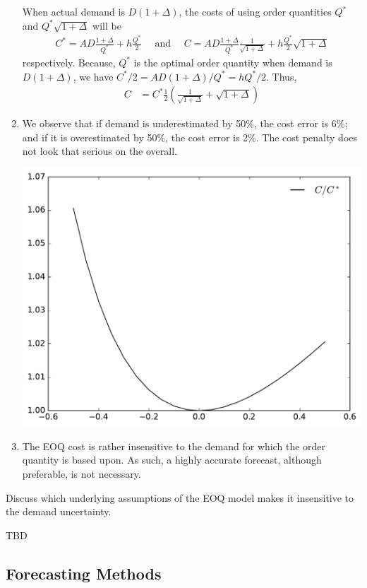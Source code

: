\begin{question}
\begin{solution}
\begin{enumerate}
When actual demand is $D(1+\Delta)$, the costs of using order quantities $Q^*$ and $Q^*\sqrt{1+\Delta}$ will be 
\begin{align*}
C^* = AD\frac{1+\Delta}{Q^*}+ h\frac{Q^*}{2} \quad \text{ and } \quad C = AD\frac{1+\Delta}{Q^*}\frac{1}{\sqrt{1+\Delta}}+h\frac{Q^*}{2}\sqrt{1+\Delta}
\end{align*}
respectively. Because, $Q^*$ is the optimal order quantity when demand is $D(1+\Delta)$, we have $C^*/2=AD(1+\Delta)/Q^*=hQ^*/2$. Thus, 
\begin{align*}
C & = C^*\frac{1}{2}\left(\frac{1}{\sqrt{1+\Delta}}+\sqrt{1+\Delta}\right)
\end{align*}
\item We observe that if demand is underestimated by 50\%, the cost error is 6\%; and if it is overestimated by 50\%, the cost error is 2\%. The cost penalty does not look that serious on the overall.
\begin{center}
\includegraphics[width=.5\linewidth]{figures/Figure_1.pdf}
\end{center}
\item The EOQ cost is rather insensitive to the demand for which the order quantity is based upon. As such, a highly accurate forecast, although preferable, is not necessary. 
\end{enumerate}
    
  \end{solution}
\end{question}

\begin{question}
Discuss which underlying assumptions of the EOQ model makes it insensitive to the demand uncertainty. 
  \begin{solution}
  TBD
  \end{solution}
\end{question}


\subsection{Forecasting Methods}

